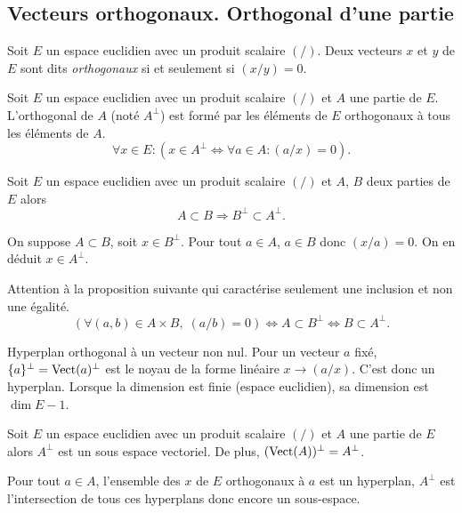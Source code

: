 \subsection{Vecteurs orthogonaux. Orthogonal d'une partie}
\begin{defi} 
 Soit $E$ un espace euclidien avec un produit scalaire $(/)$. Deux vecteurs $x$ et $y$ de $E$ sont dits \emph{orthogonaux} si et seulement si $(x/y)=0$.
\end{defi}
\begin{defi}
 Soit $E$ un espace euclidien avec un produit scalaire $(/)$ et $A$ une partie de $E$. L'orthogonal de $A$ (noté $A^\bot$) est formé par les éléments de $E$ orthogonaux à tous les éléments de $A$.
\begin{displaymath}
 \forall x\in E : \left( x\in A^\bot \Leftrightarrow
\forall a\in A : (a/x)=0 \right) .
\end{displaymath}
\end{defi}
\begin{prop}
 Soit $E$ un espace euclidien avec un produit scalaire $(/)$ et $A$, $B$ deux parties de $E$ alors 
\begin{displaymath}
 A \subset B \Rightarrow B^\bot \subset A^\bot .
\end{displaymath}
\end{prop}
\begin{demo}
On suppose $A \subset B$, soit $x\in B^\bot$. Pour tout $a\in A$, $a\in B$ donc $(x/a)=0$. On en déduit $x \in A^\bot$.
\end{demo}
\begin{rem}
 Attention à la proposition suivante qui caractérise seulement une inclusion et non une égalité.
\[
 \left(  \forall (a,b) \in A\times B,\; (a/b) = 0\right) \Leftrightarrow A \subset B^\bot \Leftrightarrow B \subset A^\bot. 
\]
\end{rem}

\begin{defi}
Hyperplan orthogonal à un vecteur non nul. Pour un vecteur $a$ fixé, $\{a\}^{\bot}=\mathop{\mathrm{Vect}}(a)^\bot$ est le noyau de la forme linéaire $x\rightarrow (a/x)$. C'est donc un hyperplan. Lorsque la dimension est finie (espace euclidien), sa dimension est $\dim E -1$.  
\end{defi}

\begin{prop}
 Soit $E$ un espace euclidien avec un produit scalaire $(/)$ et $A$ une partie de $E$ alors $A^\bot$ est un sous espace vectoriel. De plus, $(\mathop{\mathrm{Vect}}(A))^\bot = A^\bot$.
\end{prop}
\begin{demo}
Pour tout $a\in A$, l'ensemble des $x$ de $E$ orthogonaux à $a$ est un hyperplan, $A^\bot$ est l'intersection de tous ces hyperplans donc encore un sous-espace.
\end{demo}

